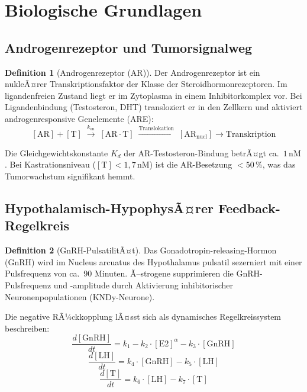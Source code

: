 ﻿\documentclass[a4paper,12pt]{article}
\theoremstyle{definition}
\newtheorem{definition}{Definition}
\begin{document}
\section{Biologische Grundlagen}

\subsection{Androgenrezeptor und Tumorsignalweg}

\begin{definition}[Androgenrezeptor (AR)]
Der Androgenrezeptor ist ein nukleÃ¤rer Transkriptionsfaktor der Klasse der Steroidhormonrezeptoren.
Im ligandenfreien Zustand liegt er im Zytoplasma in einem Inhibitorkomplex vor.
Bei Ligandenbindung (Testosteron, DHT) transloziert er in den Zellkern und aktiviert androgenresponsive Genelemente (ARE):
\[
  [\mathrm{AR}] + [\mathrm{T}] \;\xrightarrow{k_{\mathrm{on}}}\; [\mathrm{AR} \cdot \mathrm{T}] \;\xrightarrow{\text{Translokation}}\; [\mathrm{AR}_{\mathrm{nucl}}] \xrightarrow{} \text{Transkription}
\]
\end{definition}

Die Gleichgewichtskonstante $K_d$ der AR-Testosteron-Bindung betrÃ¤gt ca.\ $1\,\text{nM}$.
Bei Kastrationsniveau ($[\mathrm{T}] < 1{,}7\,\text{nM}$) ist die AR-Besetzung $< 50\,\%$, was das Tumorwachstum signifikant hemmt.

\subsection{Hypothalamisch-HypophysÃ¤rer Feedback-Regelkreis}

\begin{definition}[GnRH-PulsatilitÃ¤t]
Das Gonadotropin-releasing-Hormon (GnRH) wird im Nucleus arcuatus des Hypothalamus pulsatil sezerniert mit einer Pulsfrequenz von ca.\ 90 Minuten.
Ã–strogene supprimieren die GnRH-Pulsfrequenz und -amplitude durch Aktivierung inhibitorischer Neuronenpopulationen (KNDy-Neurone).
\end{definition}

Die negative RÃ¼ckkopplung lÃ¤sst sich als dynamisches Regelkreissystem beschreiben:
\begin{equation}
  \frac{d[\mathrm{GnRH}]}{dt} = k_1 - k_2 \cdot [\mathrm{E2}]^{\alpha} - k_3 \cdot [\mathrm{GnRH}]
  \label{eq:gnrh}
\end{equation}
\begin{equation}
  \frac{d[\mathrm{LH}]}{dt} = k_4 \cdot [\mathrm{GnRH}] - k_5 \cdot [\mathrm{LH}]
  \label{eq:lh}
\end{equation}
\begin{equation}
  \frac{d[\mathrm{T}]}{dt} = k_6 \cdot [\mathrm{LH}] - k_7 \cdot [\mathrm{T}]
  \label{eq:testo}
\end{equation}
\end{document}

